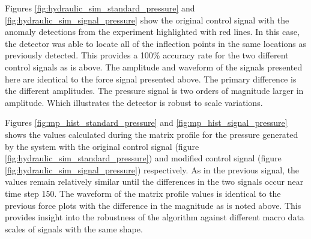 
Figures \ref{fig:hydraulic_sim_standard_pressure} and \ref{fig:hydraulic_sim_signal_pressure} show the original control signal with the anomaly detections from the experiment highlighted with red lines. In this case, the detector was able to locate all of the inflection points in the same locations as previously detected. This provides a 100\% accuracy rate for the two different control signals as is above. The amplitude and waveform of the signals presented here are identical to the force signal presented above. The primary difference is the different amplitudes. The pressure signal is two orders of magnitude larger in amplitude. Which illustrates the detector is robust to scale variations. 


Figures \ref{fig:mp_hist_standard_pressure} and \ref{fig:mp_hist_signal_pressure} shows the values calculated during the matrix profile for the pressure generated by the system with the original control signal (figure \ref{fig:hydraulic_sim_standard_pressure}) and modified control signal (figure \ref{fig:hydraulic_sim_signal_pressure}) respectively. As in the previous signal, the values remain relatively similar until the differences in the two signals occur near time step 150. The waveform of the matrix profile values is identical to the previous force plots with the difference in the magnitude as is noted above. This provides insight into the robustness of the algorithm against different macro data scales of signals with the same shape.

